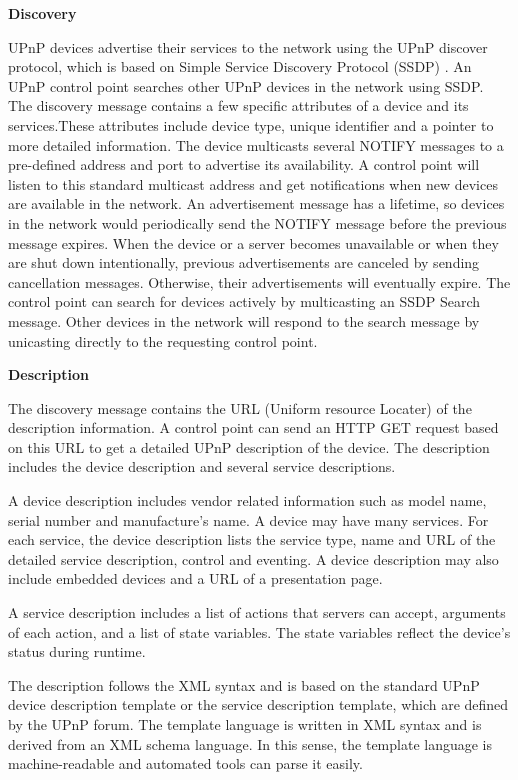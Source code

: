 \textbf{Discovery} 

UPnP devices advertise their services to the network using the UPnP discover protocol, which is based on 
Simple Service Discovery Protocol (SSDP) \cite{ssdp_rfc}. An UPnP control point
searches other UPnP devices in the network using SSDP. The discovery message contains a few specific attributes of a device and its services.These attributes include device type, unique identifier and a 
pointer to more detailed information. The device multicasts several NOTIFY
messages to a pre-defined address and port to advertise its availability. A control point will listen to this standard multicast address and get 
notifications when new devices are available in the network. 
An advertisement message has a lifetime, so devices in the network would periodically send 
the NOTIFY message before the previous message expires. When the device or a server becomes unavailable or when they are shut down intentionally, previous advertisements are canceled by sending cancellation messages. Otherwise, their advertisements will eventually expire. 
The control point can search for devices actively by multicasting an SSDP Search message. Other devices 
in the network will respond to the search message by unicasting directly to the
requesting control point.

\textbf{Description}

The discovery message contains the URL (Uniform resource Locater) of the
description information. A control point can send an HTTP GET request based on
this URL to get a detailed UPnP description of the device. The description includes the device description and several service descriptions. 

A device description includes vendor related information such as model name,
 serial number and manufacture's name. A device may have many services. For each
 service, the device description lists the service type, name and URL of the detailed service description, control and eventing. A device 
description may also include embedded devices and a URL of a presentation
page.

A service description includes a list of actions that servers can accept, arguments of each action, 
and a list of state variables. The state variables reflect the device's status
during runtime.

The description follows the XML syntax and is based on the standard UPnP device
description template or the service description template, which are defined by
the UPnP forum. The template language is written in XML syntax and is derived from an XML schema language. In this sense, the template language is machine-readable and automated tools can parse it easily.

